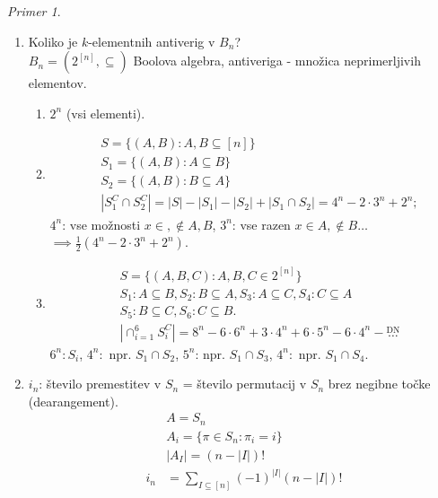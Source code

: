 \documentclass[a4paper, 12pt]{book}
\theoremstyle{definition}
\theoremstyle{remark}
\newtheorem*{ex}{Primer}
\begin{document}
%
%
%
\begin{ex}
  \begin{enumerate}[label=(\arabic{*})] \text{}
    \item Koliko je $k$-elementnih antiverig v $B_n$? \\
      $B_n = (2^{[n]}, \subseteq)$ Boolova algebra, antiveriga - množica neprimerljivih elementov.
      \begin{enumerate}[label={k=\arabic*:}]
        \item $2^n$ (vsi elementi).
        \item 
          \begin{align*}
            &S = \{(A,B): A, B \subseteq [n]\} \\
            &S_1 = \{(A,B): A \subseteq B\} \\
            &S_2 = \{(A,B): B \subseteq A\} \\
            &|S_1^C \cap S_2^C| = |S| - |S_1| - |S_2| + |S_1 \cap S_2| = 4^n - 2 \cdot 3^n + 2^n;
          \end{align*}
          $4^n$: vse možnosti $x \in, \notin A,B$, $3^n$: vse razen $x \in A, \notin B \dots$ \\
          $\implies \frac{1}{2} (4^n - 2 \cdot 3^n + 2^n)$.
        \item
          \begin{align*}
            &S = \{(A,B,C): A,B,C \in 2^{[n]}\} \\
            &S_1: A \subseteq B, S_2: B \subseteq A, S_3: A \subseteq C, S_4: C \subseteq A \\
            &S_5: B \subseteq C, S_6: C \subseteq B. \\
            &|\cap_{i=1}^6 S_i^C| = 8^n - 6 \cdot 6^n + 3 \cdot 4^n + 6 \cdot 5^n - 6 \cdot 4^n - \stackrel{\text{DN}}{\dots}
          \end{align*}
          $6^n: S_i$, $4^n:$ npr. $S_1 \cap S_2$, $5^n$: npr. $S_1 \cap S_3$, $4^n:$ npr. $S_1 \cap S_4$.
      \end{enumerate}
    \item $i_n$: število premestitev v $S_n$ = število permutacij v $S_n$ brez negibne točke (dearangement).
      \begin{align*}
        &A = S_n \\
        &A_i = \{\pi \in S_n: \pi_i = i\} \\
        &|A_{I}| = (n - |I|)! \\
        i_n &= \sum_{I \subseteq [n]} (-1)^{|I|} (n - |I|)! \\

\end{align*}
\end{enumerate}
\end{ex}
\end{document}
